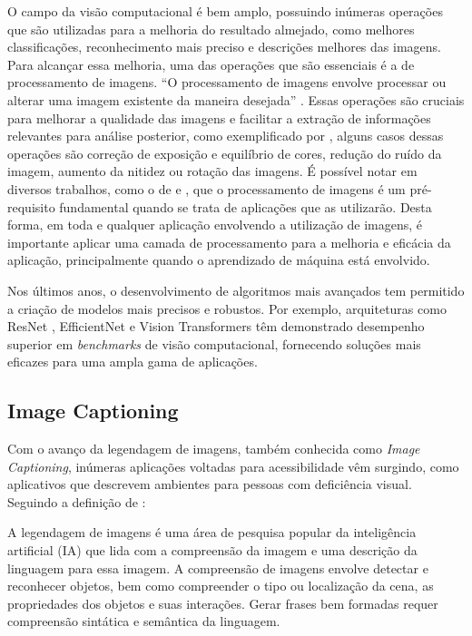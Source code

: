 O campo da visão computacional é bem amplo, possuindo inúmeras operações que são utilizadas para a melhoria do resultado almejado, como melhores classificações, reconhecimento mais preciso e descrições melhores das imagens. Para alcançar essa melhoria, uma das operações que são essenciais é a de processamento de imagens. “O processamento de imagens envolve processar ou alterar uma imagem existente da maneira desejada” \cite{Phillips1994}. Essas operações são cruciais para melhorar a qualidade das imagens e facilitar a extração de informações relevantes para análise posterior, como exemplificado por , alguns casos dessas operações são correção de exposição e equilíbrio de cores, redução do ruído da imagem, aumento da nitidez ou rotação das imagens. É possível notar em diversos trabalhos, como o de  e , que o processamento de imagens é um pré-requisito fundamental quando se trata de aplicações que as utilizarão. Desta forma, em toda e qualquer aplicação envolvendo a utilização de imagens, é importante aplicar uma camada de processamento para a melhoria e eficácia da aplicação, principalmente quando o aprendizado de máquina está envolvido.

Nos últimos anos, o desenvolvimento de algoritmos mais avançados tem permitido a criação de modelos mais precisos e robustos. Por exemplo, arquiteturas como ResNet \cite{He2015}, EfficientNet \cite{tan2019} e Vision Transformers \cite{dosovitskiy2020} têm demonstrado desempenho superior em \textit{benchmarks} de visão computacional, fornecendo soluções mais eficazes para uma ampla gama de aplicações.

\subsection{Image Captioning}

Com o avanço da legendagem de imagens, também conhecida como \textit{Image Captioning}, inúmeras aplicações voltadas para acessibilidade vêm surgindo, como aplicativos que descrevem ambientes para pessoas com deficiência visual. Seguindo a definição de :

\begin{citacao}
    A legendagem de imagens é uma área de pesquisa popular da inteligência artificial (IA) que lida com a compreensão da imagem e uma descrição da linguagem para essa imagem. A compreensão de imagens envolve detectar e reconhecer objetos, bem como compreender o tipo ou localização da cena, as propriedades dos objetos e suas interações. Gerar frases bem formadas requer compreensão sintática e semântica da linguagem.
\end{citacao}

